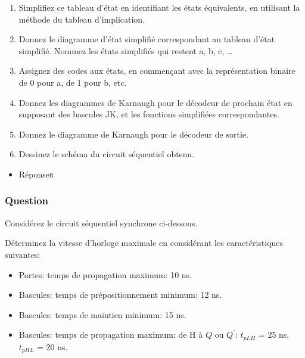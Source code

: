 \documentclass[11pt]{article}
\begin{document}
\begin{enumerate}
\item Simplifiez ce tableau d'état en identifiant les états
équivalents, en utilisant la méthode du tableau d'implication.

\item Donnez le diagramme d'état simplifié correspondant au tableau
d'état simplifié. Nommez les états simplifiés qui restent a,
b, c, \dots{}

\item Assignez des codes aux états, en commençant avec la
représentation binaire de 0 pour a, de 1 pour b, etc.

\item Donnez les diagrammes de Karnaugh pour le décodeur de prochain
état en supposant des bascules JK, et les fonctions simplifiées
correspondantes.

\item Donnez le diagramme de Karnaugh pour le décodeur de sortie.

\item Dessinez le schéma du circuit séquentiel obtenu.
\end{enumerate}

\begin{itemize}
\item Réponse\hfill{}\textsc{r}
\label{sec:orgf3984da}
\end{itemize}

\subsubsection*{Question}
\label{sec:org061cfbb}
Considérez le circuit séquentiel synchrone ci-dessous.
\begin{center}

\end{center}

Déterminez la vitesse d'horloge maximale en considérant les
caractéristiques suivantes:

\begin{itemize}
\item Portes: temps de propagation maximum: 10 ns.

\item Bascules: temps de prépositionnement minimum: 12 ns.

\item Bascules: temps de maintien minimum: 15 ns.

\item Bascules: temps de propagation maximum: de H à \(Q\) ou
\(Q^{\prime}\): \(t_{pLH}\) = 25 ns, \(t_{pHL}\) = 20 ns.
\end{itemize}
\end{document}
